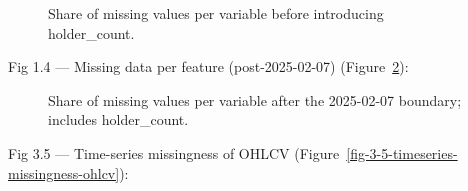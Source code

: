 \documentclass[
  a4paper,
  DIV=11,
  numbers=noendperiod]{scrreprt}
\begin{document}
\begin{figure}


\caption{\label{fig-3-3-missing-per-feature-no-holder}Share of missing
values per variable before introducing holder\_count.}

\end{figure}%

Fig 1.4 --- Missing data per feature (post-2025-02-07)
(Figure~\ref{fig-3-4-missing-per-feature-post}):

\begin{figure}


\caption{\label{fig-3-4-missing-per-feature-post}Share of missing values
per variable after the 2025-02-07 boundary; includes holder\_count.}

\end{figure}%

Fig 3.5 --- Time-series missingness of OHLCV
(Figure~\ref{fig-3-5-timeseries-missingness-ohlcv}):
\end{document}
